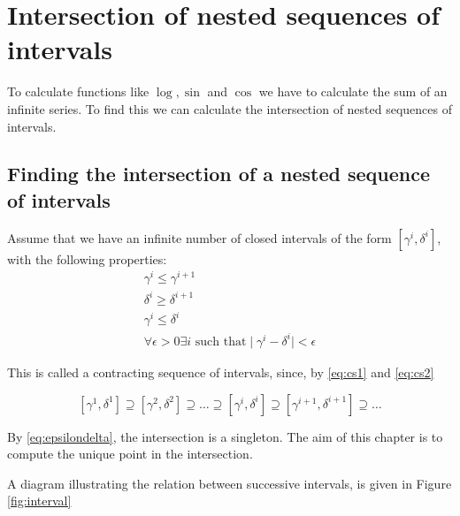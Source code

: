 \documentclass{cs4rep}
\begin{document}
\chapter{Intersection of nested sequences of intervals} \label{ch:ioi}
To calculate functions like $\log, \sin$ and $\cos$ we have to
calculate the sum of an infinite series. To find this we can calculate
the intersection of nested sequences of intervals.

\section{Finding the intersection of a nested sequence of intervals}
Assume that we have an infinite number of closed intervals of the form
$[\gamma^{i},\delta^{i}]$, with the following properties:
\begin{eqnarray}
\gamma^{i} \leq \gamma^{i+1} \label{eq:cs1} \\
\delta^{i} \geq \delta^{i+1} \label{eq:cs2} \\
\gamma^{i} \leq \delta^{i} \label{eq:cs3} \\
\forall \epsilon > 0 \exists i \mbox{ such that} \mid \gamma^{i} - \delta^{i} \mid < \epsilon   \label{eq:epsilondelta}
\end{eqnarray}

This is called a contracting sequence of intervals, since, by
\ref{eq:cs1} and \ref{eq:cs2}

\[ [\gamma^{1},\delta^{1}] \supseteq [\gamma^{2},\delta^{2}] \supseteq \ldots \supseteq [\gamma^{i},\delta^{i}] \supseteq [\gamma^{i+1},\delta^{i+1}] \supseteq \ldots \]

By \ref{eq:epsilondelta}, the intersection is a singleton. The aim of
this chapter is to compute the unique point in the intersection.

A diagram illustrating the relation between successive intervals, is
given in Figure \ref{fig:interval}
\end{document}
